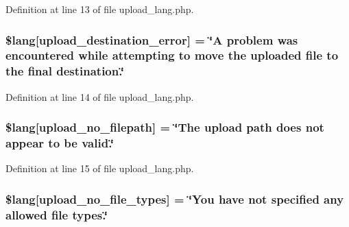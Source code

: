 Definition at line 13 of file upload\+\_\+lang.\+php.

\subsubsection[{\texorpdfstring{\$lang}{$lang}}]{\setlength{\rightskip}{0pt plus 5cm}\$lang\mbox{[}\textquotesingle{}upload\+\_\+destination\+\_\+error\textquotesingle{}\mbox{]} = \char`\"{}A problem was encountered while attempting to move the uploaded file to the final destination.\char`\"{}}\hypertarget{system_2language_2english_2upload__lang_8php_a31be70c748b9bfc43dd7468e1fa64c42}{}\label{system_2language_2english_2upload__lang_8php_a31be70c748b9bfc43dd7468e1fa64c42}


Definition at line 14 of file upload\+\_\+lang.\+php.

\subsubsection[{\texorpdfstring{\$lang}{$lang}}]{\setlength{\rightskip}{0pt plus 5cm}\$lang\mbox{[}\textquotesingle{}upload\+\_\+no\+\_\+filepath\textquotesingle{}\mbox{]} = \char`\"{}The upload path does not appear to be valid.\char`\"{}}\hypertarget{system_2language_2english_2upload__lang_8php_a3c17908c53072c6a5ef593760aaaa704}{}\label{system_2language_2english_2upload__lang_8php_a3c17908c53072c6a5ef593760aaaa704}


Definition at line 15 of file upload\+\_\+lang.\+php.

\subsubsection[{\texorpdfstring{\$lang}{$lang}}]{\setlength{\rightskip}{0pt plus 5cm}\$lang\mbox{[}\textquotesingle{}upload\+\_\+no\+\_\+file\+\_\+types\textquotesingle{}\mbox{]} = \char`\"{}You have not specified any allowed file types.\char`\"{}}\hypertarget{system_2language_2english_2upload__lang_8php_ab188c98e583c81905dedaad54ad452bb}{}\label{system_2language_2english_2upload__lang_8php_ab188c98e583c81905dedaad54ad452bb}


